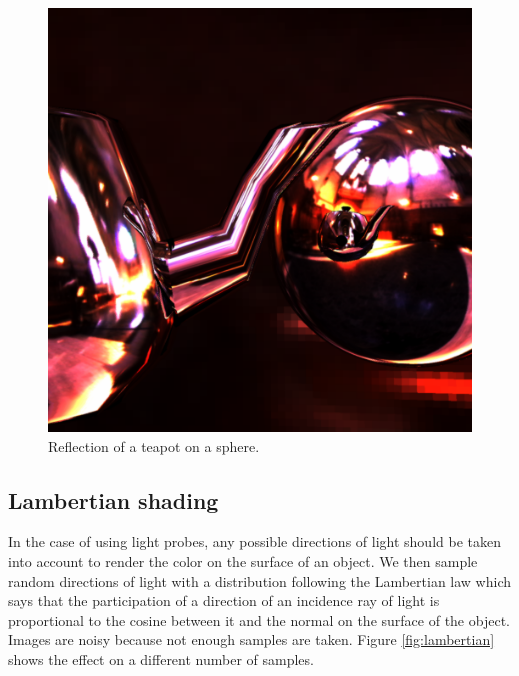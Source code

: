 \documentclass[acmsmall]{acmart}
\begin{document}
\begin{figure}[h]
    \centering
    

  \includegraphics[width=.6\linewidth]{img/reflec.png}

    
    \caption{Reflection of a teapot on a sphere.}
    \label{fig:reflec}
\end{figure}

\subsection{Lambertian shading}
In the case of using light probes, any possible directions of light should be taken into account to render the color on the surface of an object.
We then sample random directions of light with a distribution following the Lambertian law which says that the participation of a direction of an incidence ray
of light is proportional to the cosine between it and the normal on the surface of the object.
Images are noisy because not enough samples are taken. Figure \ref{fig:lambertian} shows the effect on a different number of samples.
\end{document}
